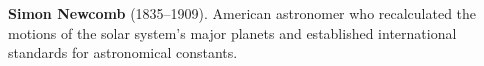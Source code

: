 \textbf{Simon Newcomb} (1835–1909). American astronomer who recalculated the motions of the solar system's major planets and established international standards for astronomical constants.

